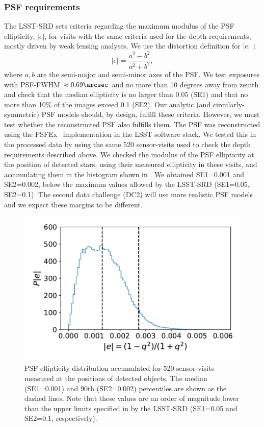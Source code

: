 \documentclass[\docopts]{\docclass}
\begin{document}
\subsubsection{PSF requirements}
\label{sssec:psf}
The LSST-SRD sets criteria regarding the maximum modulus of the PSF ellipticity, $|e|$, for visits with the same criteria used for the depth requirements, mostly driven by weak lensing analyses. We use the distortion definition for $|e|$~\citep{1991ApJ...380....1M}:
\begin{equation}
|e| = \frac{a^{2} - b^{2}}{a^{2}+b^{2}},
\end{equation}
where $a, b$ are the semi-major and semi-minor axes of the PSF. We test exposures with PSF-FWHM $\approx 0.69\arcsec$ and no more than 10 degrees away from zenith and check that the median ellipticity is no larger than 0.05 (SE1) and that no more than 10\% of the images exceed 0.1 (SE2). Our analytic (and circularly-symmetric) PSF models should, by design, fulfill these criteria. However, we must test whether the reconstructed PSF also fulfills them. The PSF was reconstructed using the PSFEx~\citep{2011ASPC..442..435B} implementation in the LSST software stack. We tested this in the processed data by using the same 520 sensor-visits used to check the depth requirements described above. We checked the modulus of the PSF ellipticity at the position of detected stars, using their measured ellipticity in these visits, and accumulating them in the histogram shown in . We obtained SE1=0.001 and SE2=0.002, below the maximum values allowed by the LSST-SRD (SE1=0.05, SE2=0.1). The second data challenge (DC2) will use more realistic PSF models and we expect these margins to be different.
\begin{figure}
\centering
\includegraphics[width=0.85\columnwidth]{PSF_ellipticity_DC1}
\caption{PSF ellipticity distribution accumulated for 520 sensor-visits measured at the positions of detected objects. The median (SE1=0.001) and 90th (SE2=0.002) percentiles are shown as the dashed lines. Note that these values are an order of magnitude lower than the upper limits specified in by the LSST-SRD (SE1=0.05 and SE2=0.1, respectively).}
\label{fig:SE1_DC1}
\end{figure}
\end{document}
